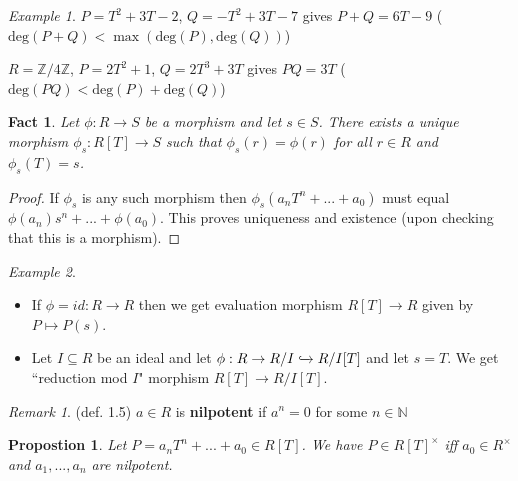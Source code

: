 \documentclass{amsart}
\newcommand{\NN}{\mathbb{N}}
\newcommand{\ZZ}{\mathbb{Z}}
\newtheorem{fact}[thm]{Fact}
\newtheorem{prop}[thm]{Propostion}
\theoremstyle{definition}
\theoremstyle{remark}
\newtheorem*{rmk}{Remark}
\newtheorem*{ex}{Example}
\begin{document}
\begin{ex}

\item $P = T^2 + 3T - 2$, $Q = -T^2 + 3T - 7$ gives $P+Q = 6T - 9$ ($\text{deg}(P+Q) < \max(\text{deg}(P),\text{deg}(Q))$)

\item $R = \ZZ/4\ZZ$, $P = 2T^2+1$, $Q = 2T^3+3T$ gives $PQ = 3T$ ($\text{deg}(PQ) < \text{deg}(P)+\text{deg}(Q)$)

\end{ex}

\begin{fact}
Let $\phi : R \rightarrow S$ be a morphism and let $s \in S$.  There exists a unique morphism $\phi_s : R[T] \rightarrow S$ such that $\phi_s(r) = \phi(r)$ for all $r \in R$ and $\phi_s(T) = s$.
\end{fact}

\begin{proof}
If $\phi_s$ is any such morphism then $\phi_s(a_nT^n + ... + a_0)$ must equal $\phi(a_n)s^n + ... + \phi(a_0)$.  This proves uniqueness and existence (upon checking that this is a morphism).
\end{proof}

\begin{ex} \hspace{0.5cm}

\begin{itemize}

\item If $\phi = id : R \rightarrow R$ then we get evaluation morphism $R[T] \rightarrow R$ given by $P \mapsto P(s)$.

\item Let $I \subseteq R$ be an ideal and let $\phi : R \rightarrow R/I \xhookrightarrow{} R/I[T]$ and let $s = T$.  We get ``reduction mod $I$" morphism $R[T]\rightarrow R/I[T]$.

\end{itemize}

\end{ex}

\begin{rmk} (def. 1.5)
$a \in R$ is \textbf{nilpotent} if $a^n = 0$ for some $n \in \NN$
\end{rmk}

\begin{prop}
Let $P = a_nT^n + ... + a_0 \in R[T]$.  We have $P \in R[T]^\times$ iff $a_0 \in R^\times$ and $a_1,...,a_n$ are nilpotent.
\end{prop}
\end{document}
